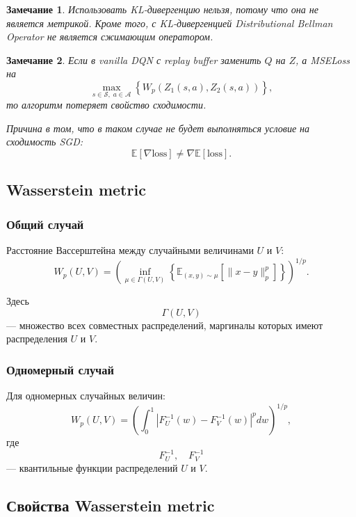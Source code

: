 \documentclass[12pt,a4paper]{article}
\newtheorem{remark}{Замечание}
\begin{document}
\begin{remark}
Использовать KL-дивергенцию нельзя, потому что она не является метрикой. Кроме того, с KL-дивергенцией Distributional Bellman Operator не является сжимающим оператором.
\end{remark}

\begin{remark}
Если в vanilla DQN с replay buffer заменить $Q$ на $Z$, а MSELoss на
\[
\max_{s \in \mathcal S,\;a \in \mathcal A}
\left\{
W_p
\left(
Z_1(s,a),
Z_2(s,a)
\right)
\right\},
\]
то алгоритм потеряет свойство сходимости.

Причина в том, что в таком случае не будет выполняться условие на сходимость SGD:
\[
\mathbb E[\nabla \mathrm{loss}]
\ne
\nabla \mathbb E[\mathrm{loss}].
\]
\end{remark}

\subsection{Wasserstein metric}

\subsubsection{Общий случай}

Расстояние Вассерштейна между случайными величинами $U$ и $V$:
\[
W_p(U,V)
=
\left(
\inf_{\mu \in \Gamma(U,V)}
\left\{
\mathbb E_{(x,y)\sim \mu}
\left[
\|x-y\|_p^p
\right]
\right\}
\right)^{1/p}.
\]

Здесь
\[
\Gamma(U,V)
\]
--- множество всех совместных распределений, маргиналы которых имеют распределения $U$ и $V$.

\subsubsection{Одномерный случай}

Для одномерных случайных величин:
\[
W_p(U,V)
=
\left(
\int_0^1
\left|
F_U^{-1}(w)
-
F_V^{-1}(w)
\right|^p
dw
\right)^{1/p},
\]
где
\[
F_U^{-1},\quad F_V^{-1}
\]
--- квантильные функции распределений $U$ и $V$.

\subsection{Свойства Wasserstein metric}
\end{document}
